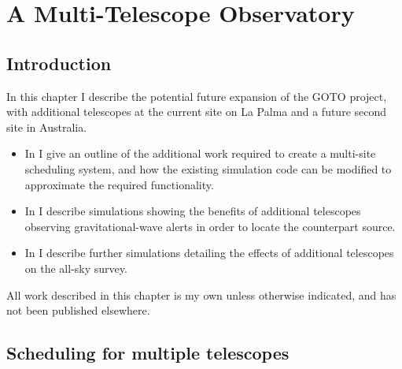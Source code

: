 
\chapter{A Multi-Telescope Observatory}
\label{chap:multiscope}


\chaptoc{}


\section{Introduction}
\label{sec:multiscope_intro}


\begin{colsection}

In this chapter I describe the potential future expansion of the GOTO project, with additional telescopes at the current site on La Palma and a future second site in Australia.
%
\begin{itemize}
    \item In  I give an outline of the additional work required to create a multi-site scheduling system, and how the existing simulation code can be modified to approximate the required functionality.
    \item In  I describe simulations showing the benefits of additional telescopes observing gravitational-wave alerts in order to locate the counterpart source.
    \item In  I describe further simulations detailing the effects of additional telescopes on the all-sky survey.
\end{itemize}
%
All work described in this chapter is my own unless otherwise indicated, and has not been published elsewhere.

\end{colsection}


\section{Scheduling for multiple telescopes}
\label{sec:multi_tel}



